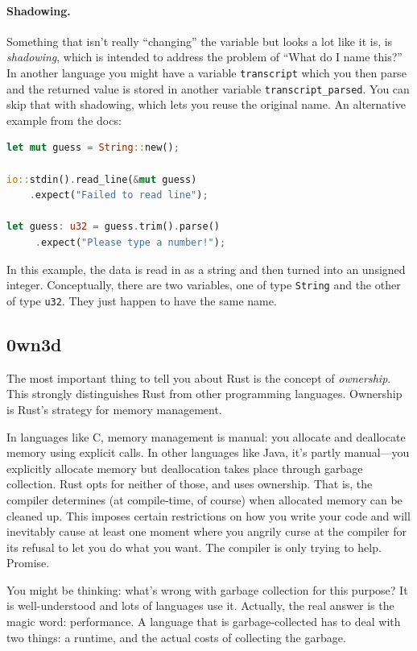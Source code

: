 \paragraph{Shadowing.}
Something that isn't really ``changing'' the variable but looks a lot like it is, is \textit{shadowing}, which is intended to address the problem of ``What do I name this?'' In another language you might have a variable \texttt{transcript} which you then parse and the returned value is stored in another variable \texttt{transcript\_parsed}. You can skip that with shadowing, which lets you reuse the original name. An alternative example from the docs:

\begin{lstlisting}[language=Rust]
let mut guess = String::new();

io::stdin().read_line(&mut guess)
    .expect("Failed to read line");

let guess: u32 = guess.trim().parse()
     .expect("Please type a number!");
\end{lstlisting}

In this example, the data is read in as a string and then turned into an unsigned integer. Conceptually, there are two variables, one of type \texttt{String} and the other of type \texttt{u32}. They just happen to have the same name.

\subsection*{0wn3d} The most important thing to tell you about Rust is the concept of \textit{ownership}. This strongly distinguishes Rust from other programming languages. Ownership is Rust's strategy for memory management. 

In languages like C, memory management is manual: you allocate and deallocate memory using explicit calls. In other languages like Java, it's partly manual---you explicitly allocate memory but deallocation takes place through garbage collection. Rust opts for neither of those, and uses ownership. That is, the compiler determines (at compile-time, of course) when allocated memory can be cleaned up. This imposes certain restrictions on how you write your code and will inevitably cause at least one moment where you angrily curse at the compiler for its refusal to let you do what you want. The compiler is only trying to help. Promise.

You might be thinking: what's wrong with garbage collection for this purpose? It is well-understood and lots of languages use it. Actually, the real answer is the magic word: performance. A language that is garbage-collected has to deal with two things: a runtime, and the actual costs of collecting the garbage.

